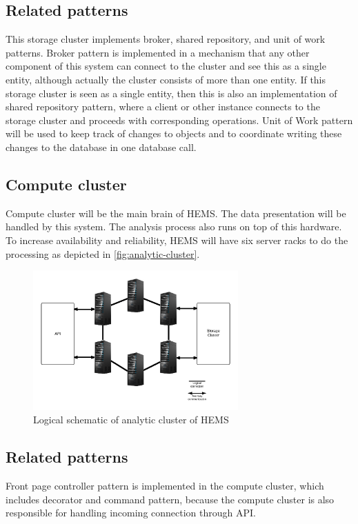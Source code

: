 \subsection*{Related patterns}
This storage cluster implements broker, shared repository, and unit of work patterns. Broker pattern is implemented in a mechanism that any other component of this system can connect to the cluster and see this as a single entity, although actually the cluster consists of more than one entity. If this storage cluster is seen as a single entity, then this is also an implementation of shared repository pattern, where a client or other instance connects to the storage cluster and proceeds with corresponding operations. Unit of Work pattern will be used to keep track of changes to objects and to coordinate writing these changes to the database in one database call.

\subsection{Compute cluster}
\label{subsec:analytics}
Compute cluster will be the main brain of HEMS. The data presentation will be handled by this system. The analysis process also runs on top of this hardware. To increase availability and reliability, HEMS will have six server racks to do the processing as depicted in \autoref{fig:analytic-cluster}.

\begin{figure}[H]
\centering
\includegraphics[width=0.7\textwidth]{6-hardware/images/analytic-cluster.png}
\caption{Logical schematic of analytic cluster of HEMS}
\label{fig:analytic-cluster}
\end{figure}

\subsection*{Related patterns}
Front page controller pattern is implemented in the compute cluster, which includes decorator and command pattern, because the compute cluster is also responsible for handling incoming connection through API. 
